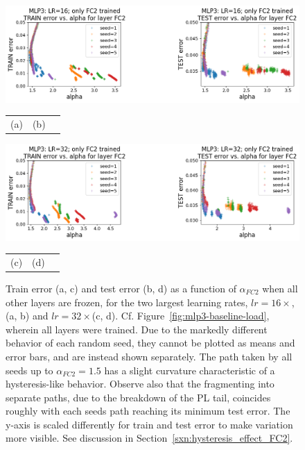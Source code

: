 \begin{figure}[t] %
    \centering
        \includegraphics[width=15cm]{img/alpha_by_epochs/mlp3_error_by_LR=16_FC2_FC2.png}
    \begin{tabular}{ccc}
      (a)\hspace{5cm} & (b) \\
    \end{tabular}
        \includegraphics[width=15cm]{img/alpha_by_epochs/mlp3_error_by_LR=32_FC2_FC2.png}
    \begin{tabular}{ccc}
      (c)\hspace{5cm} & (d) \\
    \end{tabular}
        \caption{Train error (a, c) and test error (b, d) as a function of $\alpha_{FC2}$ when all other layers are 
        frozen, for the two largest learning rates, $lr=16\times$, (a, b) and $lr=32\times$(c, d). Cf. 
        Figure~\ref{fig:mlp3-baseline-load}, wherein all layers were trained. Due to the markedly different 
        behavior of each random seed, they cannot be plotted as means and error bars, and are instead shown separately. 
        The path taken by all seeds up to $\alpha_{FC2} = 1.5$ has a slight curvature characteristic of a 
        hysteresis-like behavior. Observe also that the fragmenting into separate paths, due to the breakdown of the 
        PL tail, coincides roughly with each seeds path reaching its minimum test error. The y-axis is scaled 
        differently for train and test error to make variation more visible. See discussion in 
        Section~\ref{sxn:hysteresis_effect_FC2}.
    }
    \label{fig:mlp3-FC2-alpha-hysteresis}
\end{figure}

